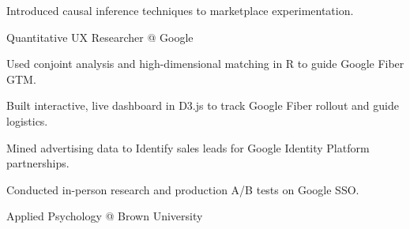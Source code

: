 \documentclass[12pt]{res}
\begin{document}
{\begin{resume}
\begin{list}{}{\leftmargin=1em}
\begin{list}{-}{\leftmargin=1em}
\item Introduced causal inference techniques to marketplace experimentation.
\end{list}
\item \raggedright{Quantitative UX Researcher @ Google\dotfill}
\begin{list}{-}{\leftmargin=1em}
\item Used conjoint analysis and high-dimensional matching in R to guide Google Fiber GTM.
\item Built interactive, live dashboard in D3.js to track Google Fiber rollout and guide logistics.
\item Mined advertising data to Identify sales leads for Google Identity Platform partnerships.
\item Conducted in-person research and production A/B tests on Google SSO.
\end{list}
\item {}
\item \raggedright{Applied Psychology @ Brown University}\dotfill {}
\item
\end{list}
\end{resume}
} %
\end{document}
